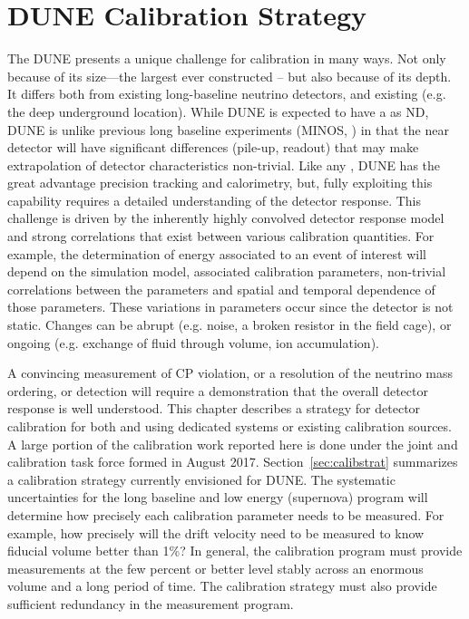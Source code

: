 \chapter{DUNE Calibration Strategy}
\label{ch:exec-summ-calib}

The DUNE  presents a unique challenge for calibration in many ways. Not only because of its size---the largest  ever constructed -- but also because of its depth. It differs both from existing long-baseline neutrino detectors, and existing  (e.g. the deep underground location). While DUNE is expected to have a  as ND, DUNE is unlike previous long baseline experiments (MINOS, ) in that the near detector will have significant differences (pile-up, readout) that may make extrapolation of detector characteristics non-trivial.  %
Like any , DUNE has the great advantage precision tracking and calorimetry, but,  fully exploiting this capability requires a detailed understanding of the detector response. This challenge is driven by the inherently highly convolved detector response model and strong correlations that exist between various calibration quantities. For example, the determination of energy associated to an event of interest will depend on the simulation model, associated calibration parameters, non-trivial correlations between the parameters and spatial and temporal dependence of those parameters. These variations in parameters occur since the detector is not static. Changes can be abrupt (e.g. noise, a broken resistor in the field cage), or ongoing (e.g. exchange of fluid through volume, ion accumulation). 

A convincing measurement of CP violation, or a resolution of the neutrino mass ordering, or   detection will require a demonstration that the overall detector response is well understood. %
This chapter describes a strategy for detector calibration for both 
 and  using dedicated  systems or existing calibration sources. A large portion of the calibration work reported here is done under the joint  and  calibration task force formed in August 2017.
Section~\ref{sec:calibstrat} summarizes a calibration strategy currently envisioned for DUNE. The systematic uncertainties for the long baseline and low energy (supernova) program will determine how precisely each calibration parameter needs to be measured. For example, how precisely will the drift velocity need to be measured to know fiducial volume better than \num{1}\%? In general, the calibration program must provide measurements at the few percent or better level stably across an enormous volume and a long period of time. The calibration strategy must also provide sufficient redundancy in the measurement program.

